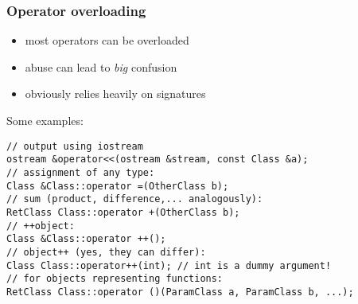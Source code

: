 \documentclass{slides}
\begin{document}
\begin{frame}[fragile]
  \frametitle{Operator overloading}

  \begin{itemize}
  \item most operators can be overloaded
  \item abuse can lead to \emph{big} confusion
  \item obviously relies heavily on signatures
  \end{itemize}

Some examples:
\begin{lstlisting}
// output using iostream
ostream &operator<<(ostream &stream, const Class &a);
// assignment of any type:
Class &Class::operator =(OtherClass b);
// sum (product, difference,... analogously):
RetClass Class::operator +(OtherClass b);
// ++object:
Class &Class::operator ++();
// object++ (yes, they can differ):
Class Class::operator++(int); // int is a dummy argument!
// for objects representing functions:
RetClass Class::operator ()(ParamClass a, ParamClass b, ...);
\end{lstlisting}

\end{frame}
\end{document}
